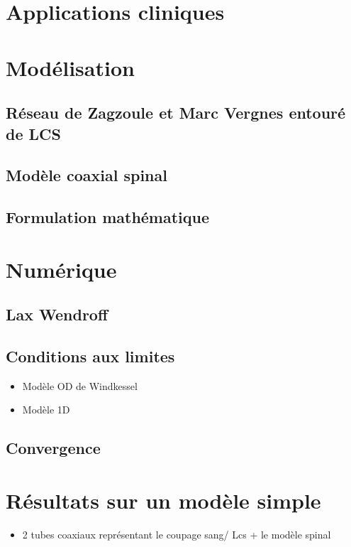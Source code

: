 \documentclass{report}
\begin{document}
\section{Applications cliniques}

\section{Modélisation}

\subsection{Réseau de Zagzoule et Marc Vergnes entouré de LCS}

\subsection{Modèle coaxial spinal}

\subsection{Formulation mathématique}

\section{Numérique}
\subsection{Lax Wendroff}
\subsection{Conditions aux limites}
\begin{itemize}
\item Modèle OD de Windkessel
\item Modèle 1D
\end{itemize}
\subsection{Convergence}

\section{Résultats sur un modèle simple}
\begin{itemize}
\item 2 tubes coaxiaux représentant le coupage sang/ Lcs + le modèle spinal
\end{itemize}
\end{document}
